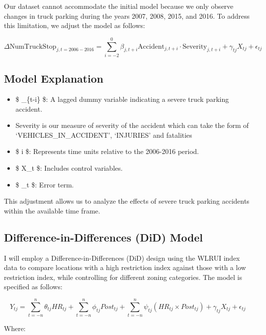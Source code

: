 \documentclass[
  12pt]{article}
\providecommand{\tightlist}{%
  \setlength{\itemsep}{0pt}\setlength{\parskip}{0pt}}\usepackage{longtable,booktabs,array}
\begin{document}
Our dataset cannot accommodate the initial model because we only observe
changes in truck parking during the years 2007, 2008, 2015, and 2016. To
address this limitation, we adjust the model as follows:

\[
\Delta \text{NumTruckStop}_{j,t=2006-2016} = \sum_{i=-2}^{0} \beta_{j,t+i} \text{Accident}_{j,t+i}\cdot \text{Severity}_{j,t+i} + \gamma_{tj} X_{tj} + \epsilon_{tj}
\]

\subsection{Model Explanation}\label{model-explanation}

\begin{itemize}
\tightlist
\item
  \$ \_\{t-i\} \$: A lagged dummy variable indicating a severe
  truck parking accident.
\item
  Severity is our measure of severity of the accident which can take the
  form of `VEHICLES\_IN\_ACCIDENT', `INJURIES' and fatalities
\item
  \$ i \$: Represents time units relative to the 2006-2016 period.
\item
  \$ X\_t \$: Includes control variables.
\item
  \$ \epsilon\_t \$: Error term.
\end{itemize}

This adjustment allows us to analyze the effects of severe truck parking
accidents within the available time frame.

\subsection{Difference-in-Differences (DiD)
Model}\label{difference-in-differences-did-model}

I will employ a Difference-in-Differences (DiD) design using the WLRUI
index data to compare locations with a high restriction index against
those with a low restriction index, while controlling for different
zoning categories. The model is specified as follows:

\[
Y_{tj} = \sum_{t=-n}^{n} \theta_{tj} HR_{tj} + \sum_{t=-n}^{n} \phi_{tj} Post_{tj} + \sum_{t=-n}^{n} \psi_{tj} (HR_{tj} \times Post_{tj}) + \gamma_{tj} X_{tj} + \epsilon_{tj}
\]

Where:
\end{document}
